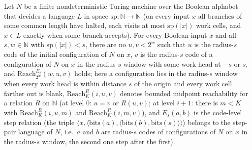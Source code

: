 \begin{theorem}
\label{Complexity.LogProg.SavitchARM.noEdge_of_lt}
\leanok
{}
Let $N$ be a finite nondeterministic Turing machine over the Boolean alphabet that decides a
language $L$ in space $\mathrm{sp}:\mathbb N\to\mathbb N$ (on every input $x$ all branches of
some common length have halted, each visits at most $\mathrm{sp}(|x|)$ work cells, and
$x\in L$ exactly when some branch accepts). For every Boolean input $x$ and all
$s,w\in\mathbb N$ with $\mathrm{sp}(|x|)<s$, there are no $u,v<2^w$ such that $u$ is the
radius-$s$ code of the initial configuration of $N$ on $x$, $v$ is the radius-$s$ code of a
configuration of $N$ on $x$ in the radius-$s$ window with some work head at $-s$ or $s$, and
$\mathrm{Reach}_{2^w}^{E_s}(w,u,v)$ holds; here a configuration lies in the radius-$s$ window when every work head is within distance $s$ of the origin and every work cell farther out is blank, $\mathrm{Reach}_K^R(i,u,v)$ denotes bounded midpoint reachability for a relation $R$ on $\mathbb N$ (at level $0$: $u=v$ or $R(u,v)$; at level $i+1$: there is $m<K$ with $\mathrm{Reach}_K^R(i,u,m)$ and $\mathrm{Reach}_K^R(i,m,v)$), and $E_s(a,b)$ is the code-level step relation (the triple $\langle x,\langle\mathrm{bits}(a),\langle\mathrm{bits}(b),\mathrm{bits}(s)\rangle\rangle\rangle$ belongs to the step-pair language of $N$, i.e.\ $a$ and $b$ are radius-$s$ codes of configurations of $N$ on $x$ in the radius-$s$ window, the second one step after the first).
\end{theorem}

